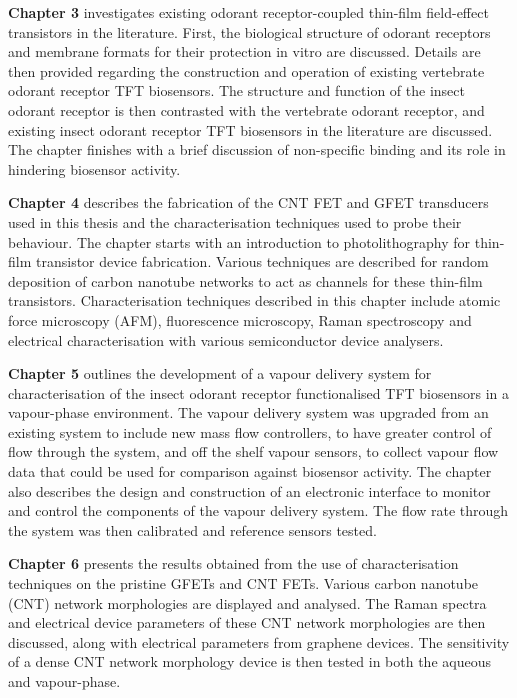 \documentclass[
  a4paper,
]{scrbook}
\begin{document}
\textbf{Chapter 3} investigates existing odorant receptor-coupled
thin-film field-effect transistors in the literature. First, the
biological structure of odorant receptors and membrane formats for their
protection in vitro are discussed. Details are then provided regarding
the construction and operation of existing vertebrate odorant receptor
TFT biosensors. The structure and function of the insect odorant
receptor is then contrasted with the vertebrate odorant receptor, and
existing insect odorant receptor TFT biosensors in the literature are
discussed. The chapter finishes with a brief discussion of non-specific
binding and its role in hindering biosensor activity.

\textbf{Chapter 4} describes the fabrication of the CNT FET and GFET
transducers used in this thesis and the characterisation techniques used
to probe their behaviour. The chapter starts with an introduction to
photolithography for thin-film transistor device fabrication. Various
techniques are described for random deposition of carbon nanotube
networks to act as channels for these thin-film transistors.
Characterisation techniques described in this chapter include atomic
force microscopy (AFM), fluorescence microscopy, Raman spectroscopy and
electrical characterisation with various semiconductor device analysers.

\textbf{Chapter 5} outlines the development of a vapour delivery system
for characterisation of the insect odorant receptor functionalised TFT
biosensors in a vapour-phase environment. The vapour delivery system was
upgraded from an existing system to include new mass flow controllers,
to have greater control of flow through the system, and off the shelf
vapour sensors, to collect vapour flow data that could be used for
comparison against biosensor activity. The chapter also describes the
design and construction of an electronic interface to monitor and
control the components of the vapour delivery system. The flow rate
through the system was then calibrated and reference sensors tested.

\textbf{Chapter 6} presents the results obtained from the use of
characterisation techniques on the pristine GFETs and CNT FETs. Various
carbon nanotube (CNT) network morphologies are displayed and analysed.
The Raman spectra and electrical device parameters of these CNT network
morphologies are then discussed, along with electrical parameters from
graphene devices. The sensitivity of a dense CNT network morphology
device is then tested in both the aqueous and vapour-phase.
\end{document}
